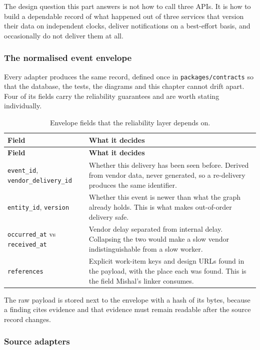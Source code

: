 The design question this part answers is not how to call three APIs. It is how
to build a dependable record of what happened out of three services that
version their data on independent clocks, deliver notifications on a
best-effort basis, and occasionally do not deliver them at all.

\subsubsection{The normalised event envelope}

Every adapter produces the same record, defined once in
\texttt{packages/\allowbreak{}contracts} so that the database, the tests, the
diagrams and this chapter cannot drift apart. Four of its fields carry the
reliability guarantees and are worth stating individually.

\begin{longtable}{>{\raggedright\arraybackslash}p{} >{\raggedright\arraybackslash}p{}}
\caption{Envelope fields that the reliability layer depends on.}\label{tab:envelope-fields}\\
\hline\textbf{Field} & \textbf{What it decides} \\
\hline\endfirsthead
\hline\textbf{Field} & \textbf{What it decides} \\
\hline\endhead
\texttt{event\_id}, \texttt{vendor\_delivery\_id} & Whether this delivery has
  been seen before. Derived from vendor data, never generated, so a
  re-delivery produces the same identifier. \\
\texttt{entity\_id}, \texttt{version} & Whether this event is newer than what
  the graph already holds. This is what makes out-of-order delivery safe. \\
\texttt{occurred\_at} vs \texttt{received\_at} & Vendor delay separated from
  internal delay. Collapsing the two would make a slow vendor
  indistinguishable from a slow worker. \\
\texttt{references} & Explicit work-item keys and design URLs found in the
  payload, with the place each was found. This is the field Mishal's linker
  consumes. \\
\hline\end{longtable}

\noindent The raw payload is stored next to the envelope with a hash of its
bytes, because a finding cites evidence and that evidence must remain readable
after the source record changes.

\subsubsection{Source adapters}

